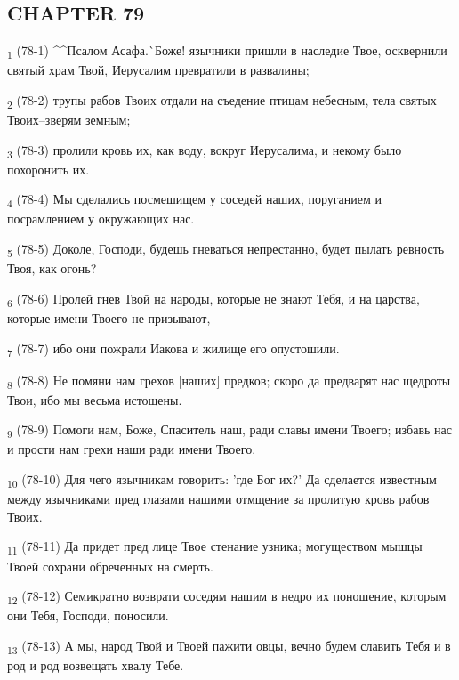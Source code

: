 \subsection{CHAPTER 79}
\begin{tcolorbox}
\textsubscript{1} (78-1) ^^Псалом Асафа.^^ Боже! язычники пришли в наследие Твое, осквернили святый храм Твой, Иерусалим превратили в развалины;
\end{tcolorbox}
\begin{tcolorbox}
\textsubscript{2} (78-2) трупы рабов Твоих отдали на съедение птицам небесным, тела святых Твоих--зверям земным;
\end{tcolorbox}
\begin{tcolorbox}
\textsubscript{3} (78-3) пролили кровь их, как воду, вокруг Иерусалима, и некому было похоронить их.
\end{tcolorbox}
\begin{tcolorbox}
\textsubscript{4} (78-4) Мы сделались посмешищем у соседей наших, поруганием и посрамлением у окружающих нас.
\end{tcolorbox}
\begin{tcolorbox}
\textsubscript{5} (78-5) Доколе, Господи, будешь гневаться непрестанно, будет пылать ревность Твоя, как огонь?
\end{tcolorbox}
\begin{tcolorbox}
\textsubscript{6} (78-6) Пролей гнев Твой на народы, которые не знают Тебя, и на царства, которые имени Твоего не призывают,
\end{tcolorbox}
\begin{tcolorbox}
\textsubscript{7} (78-7) ибо они пожрали Иакова и жилище его опустошили.
\end{tcolorbox}
\begin{tcolorbox}
\textsubscript{8} (78-8) Не помяни нам грехов [наших] предков; скоро да предварят нас щедроты Твои, ибо мы весьма истощены.
\end{tcolorbox}
\begin{tcolorbox}
\textsubscript{9} (78-9) Помоги нам, Боже, Спаситель наш, ради славы имени Твоего; избавь нас и прости нам грехи наши ради имени Твоего.
\end{tcolorbox}
\begin{tcolorbox}
\textsubscript{10} (78-10) Для чего язычникам говорить: 'где Бог их?' Да сделается известным между язычниками пред глазами нашими отмщение за пролитую кровь рабов Твоих.
\end{tcolorbox}
\begin{tcolorbox}
\textsubscript{11} (78-11) Да придет пред лице Твое стенание узника; могуществом мышцы Твоей сохрани обреченных на смерть.
\end{tcolorbox}
\begin{tcolorbox}
\textsubscript{12} (78-12) Семикратно возврати соседям нашим в недро их поношение, которым они Тебя, Господи, поносили.
\end{tcolorbox}
\begin{tcolorbox}
\textsubscript{13} (78-13) А мы, народ Твой и Твоей пажити овцы, вечно будем славить Тебя и в род и род возвещать хвалу Тебе.
\end{tcolorbox}
